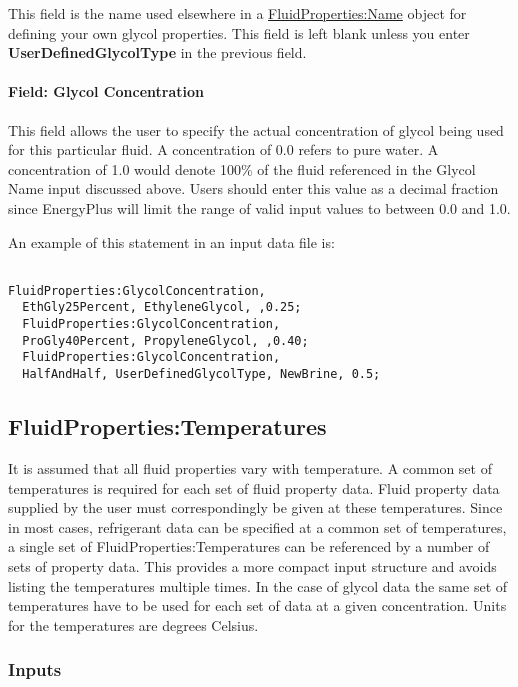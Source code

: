 This field is the name used elsewhere in a \hyperref[fluidpropertiesname]{FluidProperties:Name} object for defining your own glycol properties. This field is left blank unless you enter \textbf{UserDefinedGlycolType} in the previous field.

\paragraph{Field: Glycol Concentration}\label{field-glycol-concentration}

This field allows the user to specify the actual concentration of glycol being used for this particular fluid. A concentration of 0.0 refers to pure water. A concentration of 1.0 would denote 100\% of the fluid referenced in the Glycol Name input discussed above. Users should enter this value as a decimal fraction since EnergyPlus will limit the range of valid input values to between 0.0 and 1.0.

An example of this statement in an input data file is:

\begin{lstlisting}

FluidProperties:GlycolConcentration,
  EthGly25Percent, EthyleneGlycol, ,0.25;
  FluidProperties:GlycolConcentration,
  ProGly40Percent, PropyleneGlycol, ,0.40;
  FluidProperties:GlycolConcentration,
  HalfAndHalf, UserDefinedGlycolType, NewBrine, 0.5;
\end{lstlisting}

\subsection{FluidProperties:Temperatures}\label{fluidpropertiestemperatures}

It is assumed that all fluid properties vary with temperature. A common set of temperatures is required for each set of fluid property data. Fluid property data supplied by the user must correspondingly be given at these temperatures. Since in most cases, refrigerant data can be specified at a common set of temperatures, a single set of FluidProperties:Temperatures can be referenced by a number of sets of property data. This provides a more compact input structure and avoids listing the temperatures multiple times. In the case of glycol data the same set of temperatures have to be used for each set of data at a given concentration. Units for the temperatures are degrees Celsius.

\subsubsection{Inputs}\label{inputs-2-017}

